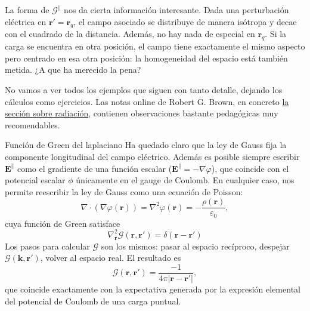 \begin{example}
    La forma de \(\boldsymbol{\mathcal{G}}^\parallel\) nos da cierta información interesante. Dada una perturbación eléctrica en \(\mathbf{r}' = \mathbf{r}_q\), el campo asociado se distribuye de manera isótropa y decae con el cuadrado de la distancia. Además, no hay nada de especial en \(\mathbf{r}_q\). Si la carga se encuentra en otra posición, el campo tiene exactamente el mismo aspecto pero centrado en esa otra posición: la homogeneidad del espacio está también metida. ¿A que ha merecido la pena?
\end{example}

No vamos a ver todos los ejemplos que siguen con tanto detalle, dejando los cálculos como ejercicios. Las notas online de Robert G. Brown, en concreto \href{https://webhome.phy.duke.edu/~rgb/Class/phy319/phy319/node69.html}{la sección sobre radiación}, contienen observaciones bastante pedagógicas muy recomendables.

\begin{example}
    {Función de Green del laplaciano
    \label{ej.1-laplacian_green}    
    }
    Ha quedado claro que la ley de Gauss fija la componente longitudinal del campo eléctrico. Además es posible siempre escribir \(\mathbf{E}^\parallel\) como el gradiente de una función escalar (\(\mathbf{E}^\parallel = -\nabla\varphi\)), que coincide con el potencial escalar \(\phi\) únicamente en el gauge de Coulomb. En cualquier caso, nos permite reescribir la ley de Gauss como una ecuación de Poisson:
    \begin{equation}
        \nabla\cdot(\nabla\varphi(\mathbf{r})) = \nabla^2\varphi(\mathbf{r}) = -\frac{\rho(\mathbf{r})}{\varepsilon_0},
    \end{equation}
    cuya función de Green satisface
    \begin{equation}
        \nabla^2_\mathbf{r}\mathcal{G}(\mathbf{r}, \mathbf{r}') = \delta(\mathbf{r}-\mathbf{r}')
    \end{equation}
    Los pasos para calcular \(\mathcal{G}\) son los mismos: pasar al espacio recíproco, despejar \(\mathcal{G}(\mathbf{k}, \mathbf{r}')\), volver al espacio real. El resultado es
    \begin{equation}
        \mathcal{G}(\mathbf{r}, \mathbf{r}') =  \frac{-1}{4\pi|\mathbf{r}-\mathbf{r}'|},
    \end{equation}
    que coincide exactamente con la expectativa generada por la expresión elemental del potencial de Coulomb de una carga puntual.
\end{example}

